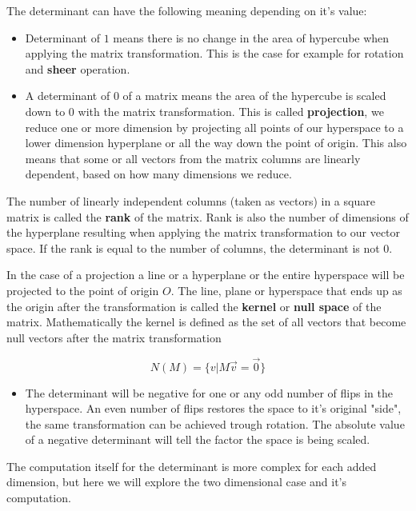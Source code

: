 The determinant can have the following meaning depending on it's value:
\begin{itemize}
    \item Determinant of \(1\) means there is no change in the area of hypercube when applying the matrix transformation. This is the case for example for rotation and \textbf{sheer} operation.
    \item A determinant of \(0\) of a matrix means the area of the hypercube is scaled down to \(0\) with the matrix transformation. This is called \textbf{projection}, we reduce one or more dimension by projecting all points of our hyperspace to a lower dimension hyperplane or all the way down the point of origin. This also means that some or all vectors from the matrix columns are linearly dependent, based on how many dimensions we reduce.
\end{itemize}

    The number of linearly independent columns (taken as vectors) in a square matrix is called the \textbf{rank} of the matrix. Rank is also the number of dimensions of the hyperplane resulting when applying the matrix transformation to our vector space. If the rank is equal to the number of columns, the determinant is not \(0\).

    In the case of a projection a line or a hyperplane or the entire hyperspace will be projected to the point of origin \(O\). The line, plane or hyperspace that ends up as the origin after the transformation is called the \textbf{kernel} or \textbf{null space} of the matrix. Mathematically the kernel is defined as the set of all vectors that become null vectors after the matrix transformation

    \begin{equation}N(M)=\{v|M \vec v=\vec 0\} \tag{II.3}\end{equation}
\begin{itemize}
    \item The determinant will be negative for one or any odd number of flips in the hyperspace. An even number of flips restores the space to it's original "side", the same transformation can be achieved trough rotation. The absolute value of a negative determinant will tell the factor the space is being scaled.
\end{itemize}

The computation itself for the determinant is more complex for each added dimension, but here we will explore the two dimensional case and it's computation.


